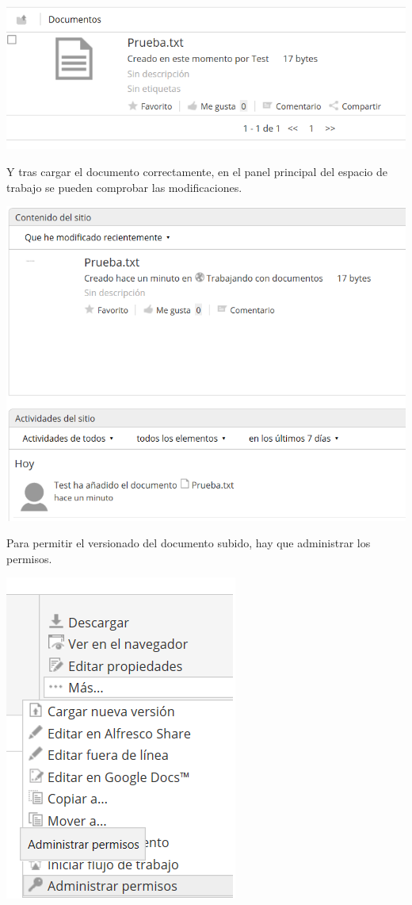 \documentclass{article}
\begin{document}
\begin{center}
\includegraphics[scale=0.5]{images/file.png}
\end{center}

Y tras cargar el documento correctamente, en el panel principal del espacio de trabajo se pueden comprobar las modificaciones.

\begin{center}
\includegraphics[scale=0.5]{images/mods.png}
\end{center}

Para permitir el versionado del documento subido, hay que administrar los permisos.

\begin{center}
\includegraphics[scale=0.5]{images/ver.png}
\end{center}
\end{document}
